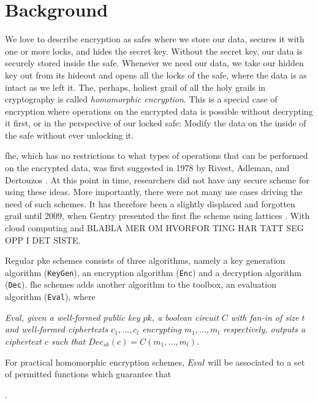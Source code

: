 \chapter{Background}
\label{chp:background}


We love to describe encryption as safes where we store our data, secures it with one or more locks, and hides the secret key. Without the secret key, our data is securely stored inside the safe. Whenever we need our data, we take our hidden key out from its hideout and opens all the locks of the safe, where the data is as intact as we left it. The, perhaps, holiest grail of all the holy grails in cryptography is called \emph{homomorphic encryption}. This is a special case of encryption where operations on the encrypted data is possible without decrypting it first, or in the perspective of our locked safe: Modify the data on the inside of the safe without ever unlocking it. 

\Gls{fhe}, which has no restrictions to what types of operations that can be performed on the encrypted data, was first suggested in 1978 by Rivest, Adleman, and Dertouzos \cite{rivest1978data}. At this point in time, researchers did not have any secure scheme for using these ideas. More importantly, there were not many use cases driving the need of such schemes. It has therefore been a slightly displaced and forgotten grail until 2009, when Gentry presented the first \gls{fhe} scheme using lattices \cite{Gentry_first_lattices}. With cloud computing and BLABLA MER OM HVORFOR TING HAR TATT SEG OPP I DET SISTE.


Regular \gls{pke} schemes consists of three algorithms, namely a key generation algorithm (\texttt{KeyGen}), an encryption algorithm (\texttt{Enc}) and a decryption algorithm (\texttt{Dec}). \gls{fhe} schemes adds another algorithm to the toolbox, an evaluation algorithm (\texttt{Eval}), where

\textit{Eval, given a well-formed public key $pk$, a boolean circuit $C$ with fan-in of size $t$ and well-formed ciphertexts $c_1, ... , c_l$ encrypting $m_1, ..., m_l$ respectively, outputs a ciphertext $c$ such that $Dec_{sk}(c) = C(m_1, ..., m_l)$.} \cite{damgaard2012secure}

For practical homomorphic encryption schemes, $Eval$ will be associated to a set of permitted functions which guarantee that 



\cite{Gentry_computing_arb_func_enc_data}.
